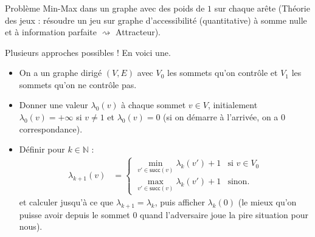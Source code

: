 \usetikzlibrary{overlay-beamer-styles}

\begin{frame}
    \frametitle{\problemtitle}
     \begin{block}{Problème}
        Min-Max dans un graphe avec des poids de $1$ sur chaque arête (Théorie des jeux : résoudre un jeu sur graphe d'accessibilité (quantitative) à somme nulle et à information parfaite $\rightsquigarrow$ Attracteur).
    \end{block}
    Plusieurs approches possibles ! En voici une.
    \pause
    \begin{itemize}
       \item<+-> On a un graphe dirigé $(V,E)$ avec $V_0$ les sommets qu'on contrôle et $V_1$ les sommets qu'on ne contrôle pas.
       \item<+-> Donner une valeur $\lambda_0(v)$ à chaque sommet $v \in V$, initialement $\lambda_0(v) = +\infty$ si $v \neq 1$ et $\lambda_0(v) = 0$ (si on démarre à l'arrivée, on a 0 correspondance).
       \item<+-> Définir pour $k \in \mathbb{N}$ :
          \begin{align*}
          \lambda_{k+1}(v)&=\begin{cases}
              \underset{v'\in\mathsf{succ}(v)}{\min} \lambda_{k}(v')+1 &\text{si } v\in V_0\\
              \underset{v'\in\mathsf{succ}(v)}{\max} \lambda_{k}(v')+1 &\text{sinon}.
          \end{cases}
          \end{align*}
          et calculer jusqu'à ce que $\lambda_{k+1} = \lambda_{k}$, puis afficher $\lambda_{k}(0)$ (le mieux qu'on puisse avoir depuis le sommet $0$ quand l'adversaire joue la pire situation pour nous).
     \end{itemize}
\end{frame}

